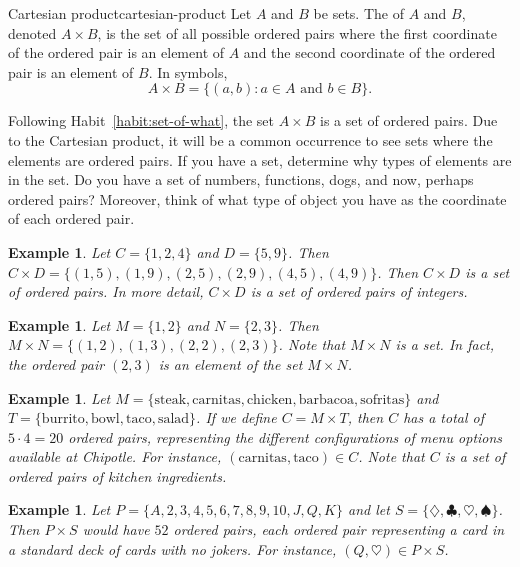 \documentclass{book}
\newcounter{ekcounter}%
\theoremstyle{ekimcustom}
\newtheorem{example}[ekcounter]{Example}
\newcommand\defn[1]{{\color{blue}{\bf #1}}}
\begin{document}
\begin{bdefinition}{Cartesian product}{cartesian-product}
Let $A$ and $B$ be sets. The \defn{Cartesian product} of $A$ and $B$, denoted $A \times B$, is the set of all possible ordered pairs where the first coordinate of the ordered pair is an element of $A$ and the second coordinate of the ordered pair is an element of $B$. In symbols,
\[A \times B = \{ (a,b) : a \in A \text{ and } b \in B\}.\]
\end{bdefinition}
Following Habit~\ref{habit:set-of-what}, the set $A \times B$ is a set of ordered pairs. Due to the Cartesian product, it will be a common occurrence to see sets where the elements are ordered pairs. If you have a set, determine why types of elements are in the set. Do you have a set of numbers, functions, dogs, and now, perhaps ordered pairs? Moreover, think of what type of object you have as the coordinate of each ordered pair.
\begin{example}
Let $C = \{1,2,4\}$ and $D=\{5,9\}$. Then $C \times D = \{(1,5), (1,9), (2,5), (2,9), (4,5), (4,9)\}$. Then $C \times D$ is a set of ordered pairs. In more detail, $C \times D$ is a set of ordered pairs of integers.
\end{example}
\begin{example}\label{example:cartesianMN}
Let $M = \{1,2\}$ and $N=\{2,3\}$. Then $M \times N = \{(1,2),(1,3),(2,2),(2,3)\}$. Note that $M \times N$ is a set. In fact, the ordered pair $(2,3)$ is an element of the set $M \times N$.
\end{example}
\begin{example}
Let $M = \{\text{steak},\text{carnitas},\text{chicken},\text{barbacoa},\text{sofritas}\}$ and $T = \{\text{burrito},\text{bowl},\text{taco},\text{salad}\}$. If we define $C = M \times T$, then $C$ has a total of $5 \cdot 4 = 20$ ordered pairs, representing the different configurations of menu options available at Chipotle. For instance, $(\text{carnitas},\text{taco}) \in C$. Note that $C$ is a set of ordered pairs of kitchen ingredients.
\end{example}
\begin{example}
Let $P = \{A,2,3,4,5,6,7,8,9,10,J,Q,K\}$ and let $S = \{\diamondsuit, \clubsuit, \heartsuit, \spadesuit\}$. Then $P \times S$ would have $52$ ordered pairs, each ordered pair representing a card in a standard deck of cards with no jokers. For instance, $(Q,\heartsuit) \in P \times S$.
\end{example}
\end{document}
